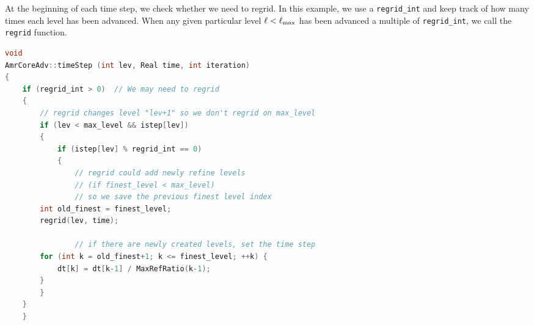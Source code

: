 At the beginning of each time step, we check whether we need to regrid.
In this example, we use a {\tt regrid\_int} and keep track of how many times each level
has been advanced.  When any given particular level $\ell<\ell_{\rm max}$ has been
advanced a multiple of {\tt regrid\_int}, we call the {\tt regrid} function.
\begin{lstlisting}[language=cpp]
void
AmrCoreAdv::timeStep (int lev, Real time, int iteration)
{
    if (regrid_int > 0)  // We may need to regrid
    {
        // regrid changes level "lev+1" so we don't regrid on max_level
        if (lev < max_level && istep[lev])
        {
            if (istep[lev] % regrid_int == 0)
            {
                // regrid could add newly refine levels
                // (if finest_level < max_level)
                // so we save the previous finest level index
		int old_finest = finest_level; 
		regrid(lev, time);

                // if there are newly created levels, set the time step
		for (int k = old_finest+1; k <= finest_level; ++k) {
		    dt[k] = dt[k-1] / MaxRefRatio(k-1);
		}
	    }
	}
    }
\end{lstlisting}

